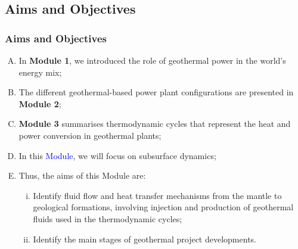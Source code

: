 \documentclass[10pt,compress]{beamer}
\newcommand{\blue}{\textcolor{blue}}
\begin{document}
 \subsection{Aims and Objectives}
   \begin{frame}
     \frametitle{Aims and Objectives} 
     \begin{enumerate}[A.]\scriptsize
       \item <1-> In {\bf Module 1}, we introduced the role of geothermal power in the world's energy mix;
       \item <2-> The different geothermal-based power plant configurations are presented in {\bf Module 2};
       \item <3-> {\bf Module 3} summarises thermodynamic cycles that represent the heat and power conversion in geothermal plants;
       \item <4-> In this \blue{Module}, we will focus on subsurface dynamics;
       \item <5-> Thus, the aims of this Module are:
          \begin{enumerate}[i)]\scriptsize
               \item <6-> Identify fluid flow and heat transfer mechanisms from the mantle to geological formations, involving injection and production of geothermal fluids used in the thermodynamic cycles;
               \item <7-> Identify the main stages of geothermal project developments.
          \end{enumerate} 
 \end{enumerate}
   \end{frame}

\end{document}
